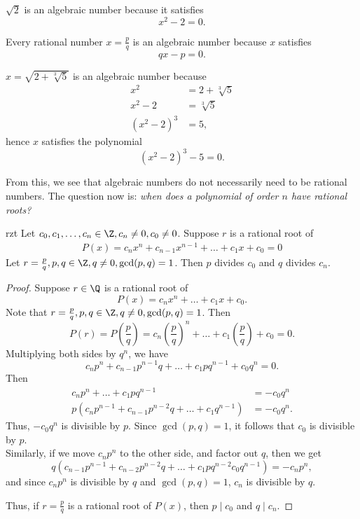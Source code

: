 \documentclass[math1010-lecture-notes]{subfiles}
\begin{document}
\begin{example}
  $ \sqrt{2} $ is an algebraic number because it satisfies \[
  x^2-2=0
  .\] 
\end{example}

\begin{example}
  Every rational number $x=\frac{p}{q}$ is an algebraic number because $x$ satisfies \[ qx-p=0 .\] 
\end{example}

\begin{example}
  $x=\sqrt{2+\sqrt[3]{5} } $ is an algebraic number because
  \begin{align*}
    x^2 &= 2+\sqrt[3]{5}  \\
    x^2-2 &= \sqrt[3]{5}  \\
    \left( x^2-2 \right) ^3&=5
  ,\end{align*} hence $x$ satisfies the polynomial \[
    \left( x^2-2 \right) ^{3}-5=0
  .\] 
\end{example}

From this, we see that algebraic numbers do not necessarily need to be rational numbers. The
question now is: \textit{when does a polynomial of order $n$ have rational roots?} 

\begin{theorem}{rzt}
  Let $ c_0,c_1,\ldots,c_n\in \Z, c_n\neq 0,c_0\neq 0$. Suppose $r$ is a rational root of
  \begin{gather}
    P(x) = c_nx^{n}+c_{n-1}x^{n-1}+\ldots+c_1x+c_0=0 \label{eq1}
  \end{gather}
  Let $r=\frac{p}{q}, p,q\in \Z,q\neq 0, \gcd(p,q)=1$. Then $p$ divides $ c_0$ and $q$ divides $c_n$.
\end{theorem}
\begin{proof}[Proof]
  Suppose $r\in \Q$ is a rational root of \[
    P(x) = c_nx^{n}+\ldots+c_1x+c_0
    .\] Note that $r=\frac{p}{q}, p,q\in \Z, q\neq 0, \gcd(p,q)=1$. Then \[
  P(r) = P(\frac{p}{q}) = c_n\left( \frac{p}{q} \right) ^{n} + \ldots + c_1\left( \frac{p}{q}
  \right) + c_0 = 0
  .\] Multiplying both sides by $q^{n}$, we have \[
  c_np^{n} + c_{n-1}p^{n-1}q + \ldots + c_1pq^{n-1}+c_0q^{n} = 0
  .\] Then
  \begin{align*}
    c_np^{n} + \ldots + c_1pq^{n-1} &= -c_0q^{n}\\
    p\left( c_np^{n-1}+c_{n-1}p^{n-2}q+\ldots+c_1q^{n-1} \right) &= -c_0q^{n}
  .\end{align*} Thus, $-c_0q^{n}$ is divisible by $p$. Since $\gcd{\left(p,q\right)}=1$, it follows
  that $c_0$ is divisible by $p$. \\
  Similarly, if we move $c_np^{n}$ to the other side, and factor out $q$, then we get  \[
    q\left( c_{n-1}p^{n-1} + c_{n-2}p^{n-2}q+\ldots+c_1pq^{n-2} c_0q^{n-1}\right) = -c_np^{n}
  ,\] and since $c_np^{n}$ is divisible by $q$ and $\gcd{\left(p,q\right)}=1$, $c_n$ is divisible by
  $q$.

  Thus, if $r=\frac{p}{q}$ is a rational root of $P(x)$, then $p \mid c_0$ and $q \mid c_n$.
\end{proof}
\end{document}
